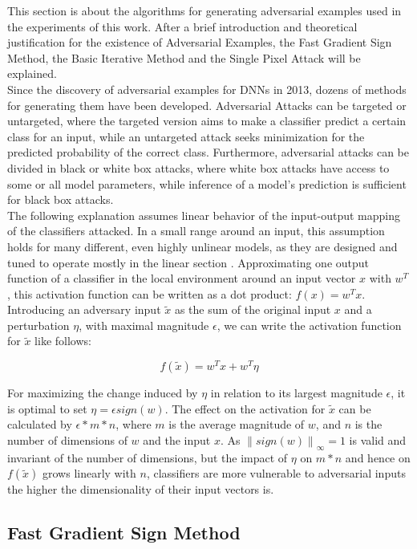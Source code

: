\documentclass[draft,final]{vutinfth} %
\newcommand{\norm}[1]{\left\lVert#1\right\rVert}
\begin{document}
This section is about the algorithms for generating adversarial examples used in the experiments of this work.
After a brief introduction and theoretical justification for the existence of Adversarial Examples, the Fast Gradient Sign Method, the Basic Iterative Method and the Single Pixel Attack will be explained.\\
Since the discovery of adversarial examples for DNNs in 2013, dozens of methods for generating them have been developed.
Adversarial Attacks can be targeted or untargeted, where the targeted version aims to make a classifier predict a certain class for an input, while an untargeted attack seeks minimization for the predicted probability of the correct class.
Furthermore, adversarial attacks can be divided in black or white box attacks, where white box attacks have access to some or all model parameters, while inference of a model's prediction is sufficient for black box attacks.
\\
The following explanation assumes linear behavior of the input-output mapping of the classifiers attacked.
In a small range around an input, this assumption holds for many different, even highly unlinear models, as they are designed and tuned to operate mostly in the linear section \cite{Goodfellow2015}.
Approximating one output function of a classifier in the local environment around an input vector $x$ with $w^T$, this activation function can be written as a dot product: $f(x) = w^Tx$.
Introducing an adversary input $\tilde{x}$ as the sum of the original input $x$ and a perturbation $\eta$, with maximal magnitude $\epsilon$, we can write the activation function for $\tilde{x}$ like follows:

\begin{equation}
	f(\tilde{x}) = w^Tx + w^T\eta
\end{equation}

For maximizing the change induced by $\eta$ in relation to its largest magnitude $\epsilon$, it is optimal to set $\eta = \epsilon sign(w)$.
The effect on the activation for $\tilde{x}$ can be calculated by $\epsilon*m*n$, where $m$ is the average magnitude of $w$, and $n$ is the number of dimensions of $w$ and the input $x$.
As $\norm{sign(w)}_\infty = 1$ is valid and invariant of the number of dimensions, but the impact of $\eta$ on $m*n$ and hence on $f(\tilde{x})$ grows linearly with $n$, classifiers are more vulnerable to adversarial inputs the higher the dimensionality of their input vectors is. \cite{Goodfellow2015}

\subsection{Fast Gradient Sign Method}
\end{document}
